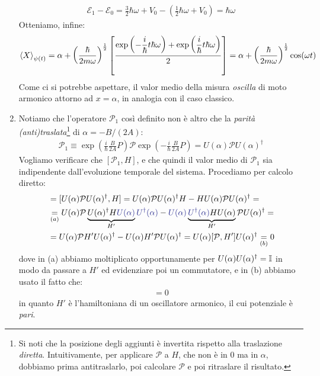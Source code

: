 \documentclass[../../FisicaTeorica.tex]{subfiles}
\begin{document}
\begin{enumerate}
\begin{align*}
\mathcal{E}_1-\mathcal{E}_0=\frac{3}{2}\hbar \omega + V_0 - \left(\frac{1}{2}\hbar \omega + V_0\right)=\hbar \omega
\end{align*}
Otteniamo, infine:
\begin{align*}
\left\langle{X}\right\rangle_{\psi(t)}=\alpha+ \left(\frac{\hbar}{2m\omega}\right)^{\frac{1}{2}}\left[ \frac{\displaystyle \exp\left(-\frac{i}{\hbar}t\hbar \omega\right) +\exp\left(\frac{i}{\hbar}t\hbar \omega\right)}{2}
\right] = \alpha + \left(\frac{\hbar}{2m\omega}\right)^{\frac{1}{2}} \cos(\omega t)
\end{align*}
Come ci si potrebbe aspettare, il valor medio della misura \textit{oscilla} di moto armonico attorno ad $x=\alpha$, in analogia con il caso classico. 
\item Notiamo che l'operatore $\mathcal{P}_1$ così definito non è altro che la \textit{parità (anti)traslata}\footnote{Si noti che la posizione degli aggiunti è invertita rispetto alla traslazione \textit{diretta}. Intuitivamente, per applicare $\mathcal{P}$ a $H$, che non è  in $0$ ma in $\alpha$, dobbiamo prima antitraslarlo, poi calcolare $\mathcal{P}$ e poi ritraslare il risultato.} di $\alpha=-B/(2A)$: \begin{align*}
\mathcal{P}_1 \equiv \exp\left(\frac{i}{\hbar}\frac{B}{2A}P\right)\mathcal{P}\exp\left(-\frac{i}{\hbar}\frac{B}{2A}P\right)=U(\alpha)\mathcal{P}U(\alpha)^\dag
\end{align*}
Vogliamo verificare che $[\mathcal{P}_1, H]$, e che quindi il valor medio di $\mathcal{P}_1$ sia indipendente dall'evoluzione temporale del sistema. Procediamo per calcolo diretto:
\begin{align*}
[\mathcal{P}_1,H] &= [U(\alpha)\mathcal{P}U(\alpha)^\dag, H] = U(\alpha)\mathcal{P}U(\alpha)^\dag H - HU(\alpha)\mathcal{P}U(\alpha)^\dag=\\
&\underset{(a)}{=}U(\alpha) \mathcal{P}\underbrace{U(\alpha)^\dag H \textcolor{Blue}{U(\alpha)}}_{H'}\textcolor{Blue}{U^\dag(\alpha)} - \textcolor{Blue}{U(\alpha)}\underbrace{\textcolor{Blue}{U^\dag(\alpha)} HU(\alpha)}_{H'}\mathcal{P}U(\alpha)^\dag =\\
&=U(\alpha) \mathcal{P} H' U(\alpha)^\dag - U(\alpha)H' \mathcal{P}U(\alpha)^\dag = U(\alpha)[\mathcal{P},H']U(\alpha)^\dag \underset{(b)}{=} 0
\end{align*}
dove in (a) abbiamo moltiplicato opportunamente per $U(\alpha)U(\alpha)^\dag = \mathbb{I}$ in modo da passare a $H'$ ed evidenziare poi un commutatore, e in (b) abbiamo usato il fatto che:
\begin{align*}
[\mathcal{P},H']=0
\end{align*}
in quanto $H'$ è l'hamiltoniana di un oscillatore armonico, il cui potenziale è \textit{pari}.


\end{enumerate}
\end{document}
